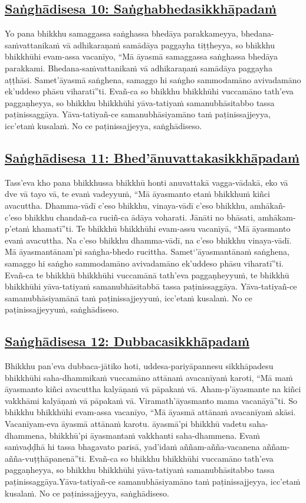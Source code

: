 \subsection*{\hyperref[comm10]{Saṅghādisesa 10: Saṅghabhedasikkhāpadaṁ}}
\label{sd10}
Yo pana bhikkhu samaggassa saṅghassa bhedāya parakkameyya, bhedana-saṁvattanikaṁ vā adhikaraṇaṁ samādāya paggayha tiṭṭheyya, so bhikkhu bhikkhūhi evam-assa vacanīyo, “Mā āyasmā samaggassa saṅghassa bhedāya parakkami. Bhedana-saṁvattanikaṁ vā adhikaraṇaṁ samādāya paggayha aṭṭhāsi. Samet'āyasmā saṅghena, samaggo hi saṅgho sammodamāno avivadamāno ek'uddeso phāsu viharatī”ti. Evañ-ca so bhikkhu bhikkhūhi vuccamāno tath'eva paggaṇheyya, so bhikkhu bhikkhūhi yāva-tatiyaṁ samanubhāsitabbo tassa paṭinissaggāya. Yāva-tatiyañ-ce samanubhāsiyamāno taṁ paṭinissajjeyya, icc'etaṁ kusalaṁ. No ce paṭinissajjeyya, saṅghādiseso.

\subsection*{\hyperref[comm11]{Saṅghādisesa 11: Bhed'ānuvattakasikkhāpadaṁ}}
\label{sd11}
Tass'eva kho pana bhikkhussa bhikkhū honti anuvattakā vagga-vādakā, eko vā dve vā tayo vā, te evaṁ vadeyyuṁ, “Mā āyasmanto etaṁ bhikkhuṁ kiñci avacuttha. Dhamma-vādī c'eso bhikkhu, vinaya-vādī c'eso bhikkhu, amhākañ-c'eso bhikkhu chandañ-ca ruciñ-ca ādāya voharati. Jānāti no bhāsati, amhākam-p'etaṁ khamatī”ti. Te bhikkhū bhikkhūhi evam-assu vacanīyā, “Mā āyasmanto evaṁ avacuttha. Na c'eso bhikkhu dhamma-vādī, na c'eso bhikkhu vinaya-vādī. Mā āyasmantānam'pi saṅgha-bhedo rucittha. Samet‘'āyasmantānaṁ saṅghena, samaggo hi saṅgho sammodamāno avivadamāno ek'uddeso phāsu viharatī”ti. Evañ-ca te bhikkhū bhikkhūhi vuccamānā tath'eva paggaṇheyyuṁ, te bhikkhū bhikkhūhi yāva-tatiyaṁ samanubhāsitabbā tassa paṭinissaggāya. Yāva-tatiyañ-ce samanubhāsiyamānā taṁ paṭinissajjeyyuṁ, icc'etaṁ kusalaṁ. No ce paṭinissajjeyyuṁ, saṅghādiseso.

\subsection*{\hyperref[comm12]{Saṅghādisesa 12: Dubbacasikkhāpadaṁ}}
\label{sd12}
Bhikkhu pan'eva dubbaca-jātiko hoti, uddesa-pariyāpannesu sikkhāpadesu bhikkhūhi saha-dhammikaṁ vuccamāno attānaṁ avacanīyaṁ karoti, “Mā maṁ āyasmanto kiñci avacuttha kalyāṇaṁ vā pāpakaṁ vā. Aham-p'āyasmante na kiñci vakkhāmi kalyāṇaṁ vā pāpakaṁ vā. Viramath'āyasmanto mama vacanāyā”ti. So bhikkhu bhikkhūhi evam-assa vacanīyo, “Mā āyasmā attānaṁ avacanīyaṁ akāsi. Vacanīyam-eva āyasmā attānaṁ karotu. āyasmā'pi bhikkhū vadetu saha-dhammena, bhikkhū'pi āyasmantaṁ vakkhanti saha-dhammena. Evaṁ saṁvaḍḍhā hi tassa bhagavato parisā, yad'idaṁ aññam-añña-vacanena aññam-añña-vuṭṭhāpanenā”ti. Evañ-ca so bhikkhu bhikkhūhi vuccamāno tath'eva paggaṇheyya, so bhikkhu bhikkhūhi yāva-tatiyaṁ samanubhāsitabbo tassa paṭinissaggāya.Yāva-tatiyañ-ce samanubhāsiyamāno taṁ paṭinissajjeyya, icc'etaṁ kusalaṁ. No ce paṭinissajjeyya, saṅghādiseso.

